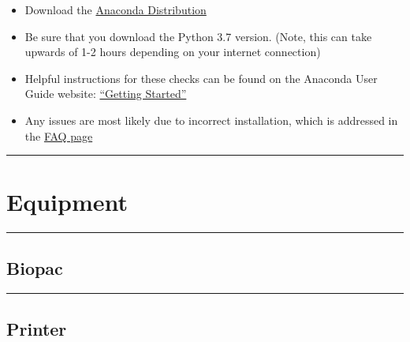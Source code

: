 \documentclass[]{book}
\providecommand{\tightlist}{%
  \setlength{\itemsep}{0pt}\setlength{\parskip}{0pt}}
\begin{document}
\begin{itemize}
\tightlist
\item
  Download the \href{https://www.anaconda.com/distribution/}{Anaconda Distribution}
\item
  Be sure that you download the Python 3.7 version. (Note, this can take upwards of 1-2 hours depending on your internet connection)
\item
  Helpful instructions for these checks can be found on the Anaconda User Guide website: \href{https://docs.anaconda.com/anaconda/user-guide/getting-started/}{``Getting Started''}
\item
  Any issues are most likely due to incorrect installation, which is addressed in the \href{https://docs.anaconda.com/anaconda/user-guide/faq/}{FAQ page}
\end{itemize}

\begin{center}\rule{0.5\linewidth}{\linethickness}\end{center}

\hypertarget{equipment}{%
\section{Equipment}\label{equipment}}

\begin{center}\rule{0.5\linewidth}{\linethickness}\end{center}

\hypertarget{biopac}{%
\subsection{Biopac}\label{biopac}}

\begin{center}\rule{0.5\linewidth}{\linethickness}\end{center}

\hypertarget{printer}{%
\subsection{Printer}\label{printer}}
\end{document}
